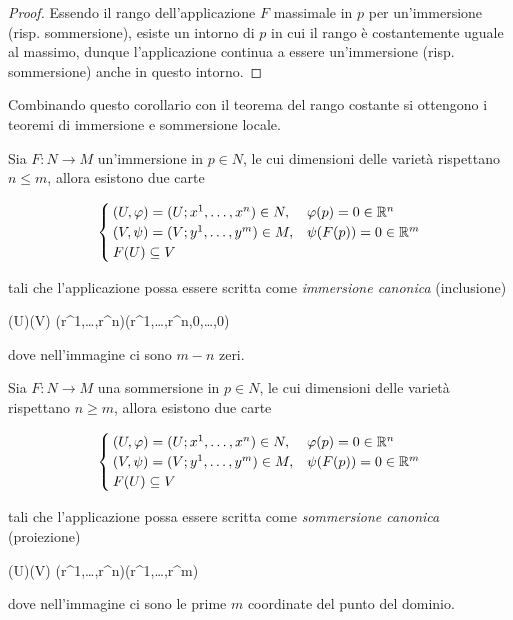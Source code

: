 \begin{proof}
	Essendo il rango dell'applicazione $ F $ massimale in $ p $ per un'immersione (risp. sommersione), esiste un intorno di $ p $ in cui il rango è costantemente uguale al massimo, dunque l'applicazione continua a essere un'immersione (risp. sommersione) anche in questo intorno.
\end{proof}

Combinando questo corollario con il teorema del rango costante si ottengono i teoremi di immersione e sommersione locale.

\begin{theorem}\label{thm:loc-imm}
	Sia $ F : N \to M $ un'immersione in $ p \in N $, le cui dimensioni delle varietà rispettano $ n \leqslant m $, allora esistono due carte
	
	\begin{equation}
		\begin{cases}
			(U,\varphi) = (U; x^{1},\dots,x^{n}) \in N, & \varphi(p) = 0 \in \mathbb{R}^{n} \\
			(V,\psi) = (V; y^{1},\dots,y^{m}) \in M, & \psi(F(p)) = 0  \in \mathbb{R}^{m} \\
			F(U) \subseteq V
		\end{cases}
	\end{equation}
	
	tali che l'applicazione possa essere scritta come \textit{immersione canonica} (inclusione)
	
		{\varphi(U)}{\psi(V)}
		{(r^{1},\dots,r^{n})}{(r^{1},\dots,r^{n},0,\dots,0)}

	dove nell'immagine ci sono $ m-n $ zeri.
\end{theorem}

\begin{theorem}\label{thm:loc-sub}
	Sia $ F : N \to M $ una sommersione in $ p \in N $, le cui dimensioni delle varietà rispettano $ n \geqslant m $, allora esistono due carte
	
	\begin{equation}
		\begin{cases}
			(U,\varphi) = (U; x^{1},\dots,x^{n}) \in N, & \varphi(p) = 0 \in \mathbb{R}^{n} \\
			(V,\psi) = (V; y^{1},\dots,y^{m}) \in M, & \psi(F(p)) = 0 \in \mathbb{R}^{m} \\
			F(U) \subseteq V
		\end{cases}
	\end{equation}
	
	tali che l'applicazione possa essere scritta come \textit{sommersione canonica} (proiezione)
	
		{\varphi(U)}{\psi(V)}
		{(r^{1},\dots,r^{n})}{(r^{1},\dots,r^{m})}
	
	dove nell'immagine ci sono le prime $ m $ coordinate del punto del dominio.
\end{theorem}

